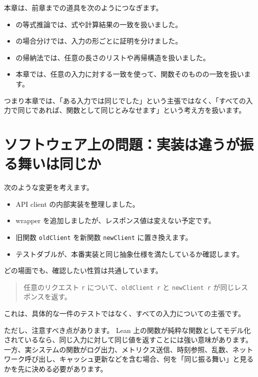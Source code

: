 
本章は、前章までの道具を次のようにつなぎます。

\begin{itemize}
\item {}の等式推論では、式や計算結果の一致を扱いました。
\item {}の場合分けでは、入力の形ごとに証明を分けました。
\item {}の帰納法では、任意の長さのリストや再帰構造を扱いました。
\item 本章では、任意の入力に対する一致を使って、関数そのものの一致を扱います。
\end{itemize}

つまり本章では、「ある入力では同じでした」という主張ではなく、「すべての入力で同じであれば、関数として同じとみなせます」という考え方を扱います。

\section{ソフトウェア上の問題：実装は違うが振る舞いは同じか}

次のような変更を考えます。

\begin{itemize}
\item API client の内部実装を整理しました。
\item wrapper を追加しましたが、レスポンス値は変えない予定です。
\item 旧関数 \texttt{oldClient} を新関数 \texttt{newClient} に置き換えます。
\item テストダブルが、本番実装と同じ抽象仕様を満たしているか確認します。
\end{itemize}

どの場面でも、確認したい性質は共通しています。

\begin{quote}
任意のリクエスト \texttt{r} について、\texttt{oldClient r} と \texttt{newClient r} が同じレスポンスを返す。
\end{quote}

これは、具体的な一件のテストではなく、すべての入力についての主張です。

ただし、注意すべき点があります。
Lean 上の関数が純粋な関数としてモデル化されているなら、同じ入力に対して同じ値を返すことには強い意味があります。
一方、実システムの関数がログ出力、メトリクス送信、時刻参照、乱数、ネットワーク呼び出し、キャッシュ更新などを含む場合、何を「同じ振る舞い」と見るかを先に決める必要があります。

